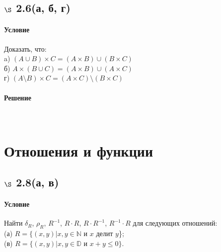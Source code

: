 \documentclass[a4paper,12pt]{article}
\begin{document}
\subsection*{$\S$ 2.6(а, б, г)}
\paragraph*{Условие}
Доказать, что:\\
a) $ ( A \cup B ) \times C = ( A \times B ) \cup ( B \times C ) $\\
б) $ A \times ( B \cup C ) = ( A \times B ) \cup ( A \times C ) $\\
г) $ ( A \setminus B ) \times C = ( A \times C ) \setminus ( B \times C ) $
\paragraph*{Решение} \mbox{}\\

\section{Отношения и функции}
\subsection*{$\S$ 2.8(а, в)}
\paragraph*{Условие}
Найти $\delta_R$, $\rho_R$, $R^{-1}$, $R\cdot R$, $R\cdot R^{-1}$, $R^{-1}\cdot R$ для следующих отношений:\\
(а) $R=\{(x,y)|x,y\in \mathbb{N}$ и $x$ делит $y$\}; \\
(в) $R=\{(x,y)|x,y\in \mathbb{D}$ и $x+y\leqslant 0\}$.
\end{document}
